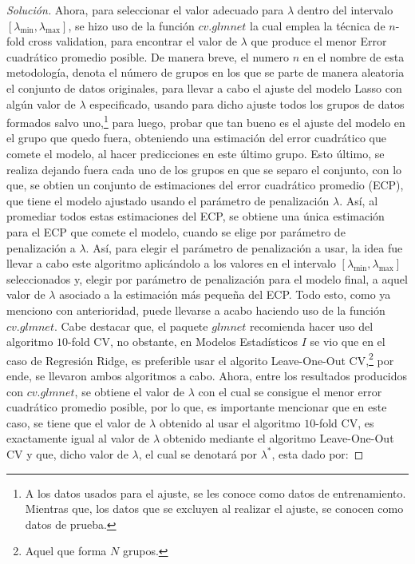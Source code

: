 \documentclass[10.5pt,notitlepage]{article}
\newenvironment{solucion}
  {\begin{proof}[Solución]}
  {\end{proof}}
\theoremstyle{plain}
\begin{document}
\begin{solucion}
Ahora, para seleccionar el valor adecuado para \(\lambda\) dentro del intervalo \([\lambda_{\min}, \lambda_{\max}]\), se hizo uso de la función \(cv.glmnet\) la cual emplea la técnica de \(n\)-fold cross validation, para encontrar el valor de \(\lambda\) que produce el menor Error cuadrático promedio posible. De manera breve, el numero \(n\) en el nombre de esta metodología, denota el número de grupos en los que se parte de manera aleatoria el conjunto de datos originales, para llevar a cabo el ajuste del modelo Lasso con algún valor de \(\lambda\) especificado, usando para dicho ajuste todos los grupos de datos formados salvo uno,\footnote{A los datos usados para el ajuste, se les conoce como datos de entrenamiento. Mientras que, los datos que se excluyen al realizar el ajuste, se conocen como datos de prueba.} para luego, probar que tan bueno es el ajuste del modelo en el grupo que quedo fuera, obteniendo una estimación del error cuadrático que comete el modelo, al hacer predicciones en este último grupo. Esto último, se realiza dejando fuera cada uno de los grupos en que se separo el conjunto, con lo que, se obtien un conjunto de estimaciones del error cuadrático promedio (ECP), que tiene el modelo ajustado usando el parámetro de penalización \(\lambda\). Así, al promediar todos estas estimaciones del ECP, se obtiene una única estimación para el ECP que comete el modelo, cuando se elige por parámetro de penalización a \(\lambda\). Así, para elegir el parámetro de penalización a usar, la idea fue llevar a cabo este algoritmo aplicándolo a los valores en el intervalo \([\lambda_{\min}, \lambda_{\max}]\) seleccionados y, elegir por parámetro de penalización para el modelo final, a aquel valor de \(\lambda\) asociado a la estimación más pequeña del ECP. Todo esto, como ya menciono con anterioridad, puede llevarse a acabo haciendo uso de la función \(cv.glmnet\). Cabe destacar que, el paquete \(glmnet\) recomienda hacer uso del algoritmo \(10\)-fold CV, no obstante, en Modelos Estadísticos \(I\) se vio que en el caso de Regresión Ridge, es preferible usar el algorito Leave-One-Out  CV,\footnote{Aquel que forma \(N\) grupos.} por ende, se llevaron ambos algoritmos a cabo. Ahora, entre los resultados producidos con \(cv.glmnet\), se obtiene el valor de \(\lambda\) con el cual se consigue el menor error cuadrático promedio posible, por lo que, es importante mencionar que en este caso, se tiene que el valor de \(\lambda\) obtenido al usar el algoritmo \(10\)-fold CV, es exactamente igual al valor de \(\lambda\) obtenido mediante el algoritmo Leave-One-Out CV y que, dicho valor de \(\lambda\), el cual se denotará por \(\lambda^*\), esta dado por:

\end{solucion}
\end{document}
